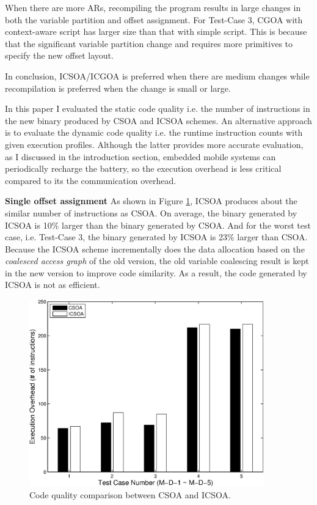 When there are more ARs, recompiling the program results in large changes in both the variable
partition and offset assignment. For Test-Case 3, CGOA with context-aware script has larger size than that with simple script. This is because that the significant variable partition change and requires more primitives to specify the new offset layout. 

In conclusion, ICSOA/ICGOA is preferred when there are medium changes while recompilation is preferred when the change is small or large.


In this paper I evaluated the static code quality i.e. the number of instructions in the new binary produced by CSOA and ICSOA schemes. An alternative approach is to evaluate the dynamic code quality i.e. the runtime instruction counts with given execution profiles. Although the latter provides more accurate evaluation, as I discussed in the introduction section, embedded mobile systems can periodically recharge the battery, so the execution overhead is less critical compared to its the communication overhead.

\textbf{Single offset assignment}
As shown in Figure \ref{exetotal}, ICSOA produces about the similar number of instructions as CSOA. On average, the binary generated by ICSOA is 10\% larger than the binary generated by CSOA. And for the worst test case, i.e. Test-Case 3, the binary generated by ICSOA is 23\% larger than CSOA. Because the ICSOA scheme incrementally does the data allocation based on the {\it coalesced access graph} of the old version, the old variable coalescing result is kept in the new version to improve code similarity. As a result, the code generated by ICSOA is not as efficient. 

\begin{figure}[htbp]
\begin{center}
\includegraphics[width=4in]{./figures/da-exe1.eps}
\caption{Code quality comparison between CSOA and ICSOA.}
\label{exetotal}
\end{center}
\vspace{-0.2in}
\end{figure}


